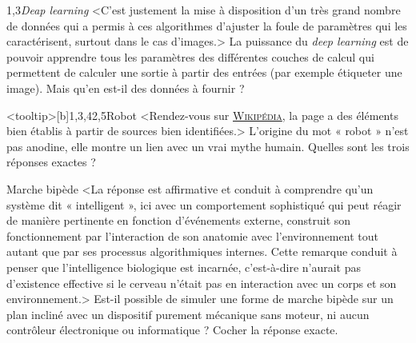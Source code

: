 \begin{quiz}[title={Robotique et intelligence artificielle}]
\begin{quizquestion*}[b]{2}{1,3}{{\itshape Deap learning}}
<C'est justement la mise à disposition d'un très grand nombre de données qui a permis à ces algorithmes d'ajuster la foule de paramètres qui les caractérisent, surtout dans le cas d'images.>
La puissance du \textit{deep learning} est de pouvoir apprendre tous les paramètres des différentes couches de calcul qui permettent de calculer une sortie à partir des entrées (par exemple étiqueter une image).
Mais qu'en est-il des données à fournir ?
\end{quizquestion*}

\begin{quizquestion}<tooltip>[b]{1,3,4}{2,5}{Robot}
<Rendez-vous sur \href{https://fr.wikipedia.org/wiki/Robot}{\textsc{Wikipédia}}, la page a des éléments bien établis à partir de sources bien identifiées.>
L'origine du mot « robot » n'est pas anodine, elle montre un lien avec un vrai mythe humain.
Quelles sont les trois réponses exactes ?
\end{quizquestion}

\begin{quizquestion*}[b]{2}{1}{Marche bipède}
<La réponse est affirmative et conduit à comprendre qu'un système dit « intelligent », ici avec un comportement sophistiqué qui peut réagir de manière pertinente en fonction d'événements externe, construit son fonctionnement par l'interaction de son anatomie avec l'environnement tout autant que par ses processus algorithmiques internes.
Cette remarque conduit à penser que l'intelligence biologique est incarnée, c'est-à-dire n'aurait pas d'existence effective si le cerveau n'était pas en interaction avec un corps et son environnement.>
Est-il possible de simuler une forme de marche bipède sur un plan incliné avec un dispositif purement mécanique sans moteur, ni aucun contrôleur électronique ou informatique ?
Cocher la réponse exacte.
\end{quizquestion*}


\end{quiz}
